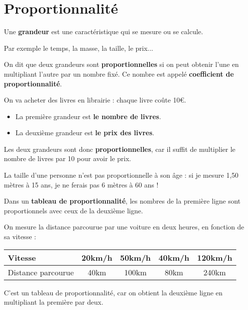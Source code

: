 \documentclass[../€Cours-complet/Cours-complet]{subfiles}
\begin{document}
\maketitleCours

\section{Proportionnalité}

\begin{vocabulaire}[Grandeur]
	Une \textbf{grandeur} est une caractéristique qui se mesure ou se calcule.

	Par exemple le temps, la masse, la taille, le prix...
\end{vocabulaire}

\begin{cours}
	On dit que deux grandeurs sont \textbf{proportionnelles} si on peut obtenir l'une en multipliant l'autre par un nombre fixé. Ce nombre est appelé \textbf{coefficient de proportionnalité}.
\end{cours}

\begin{exemple}
	On va acheter des livres en librairie : chaque livre coûte 10€.

	\begin{itemize}
		\item La première grandeur est \textbf{le nombre de livres}.
		\item La deuxième grandeur est \textbf{le prix des livres}.
	\end{itemize}

	Les deux grandeurs sont donc \textbf{proportionnelles}, car il suffit de multiplier le nombre de livres par 10 pour avoir le prix.
\end{exemple}

\begin{exemple}
	La taille d'une personne n'est pas proportionnelle à son âge : si je mesure 1,50 mètres à 15 ans, je ne ferais pas 6 mètres à 60 ans !
\end{exemple}

\begin{cours}
	Dans un \textbf{tableau de proportionnalité}, les nombres de la première ligne sont proportionnels avec ceux de la deuxième ligne.
\end{cours}

\begin{exemple}
	On mesure la distance parcourue par une voiture en deux heures, en fonction de sa vitesse : \vspace{0.5em}

	\begin{tabular}{|l|c|c|c|c|}
		\hline
		Vitesse            & 20km/h & 50km/h & 40km/h & 120km/h \\ \hline
		Distance parcourue & 40km   & 100km  & 80km   & 240km   \\ \hline
	\end{tabular}

	C'est un tableau de proportionnalité, car on obtient la deuxième ligne en multipliant la première par deux.
\end{exemple}
\end{document}
